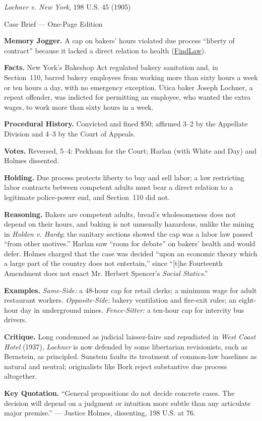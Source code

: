 \documentclass[12pt]{article}
\begin{document}
\begin{center}
{\Large \textit{Lochner v. New York}, 198 U.S. 45 (1905)\par}
\vspace{0.3em}
{\normalsize Case Brief --- One-Page Edition\par}
\end{center}

\textbf{Memory Jogger.} A cap on bakers' hours violated due process ``liberty of contract'' because it lacked a direct relation to health (\href{https://caselaw.findlaw.com/court/us-supreme-court/198/45.html}{FindLaw}).

\textbf{Facts.} New York's Bakeshop Act regulated bakery sanitation and, in Section~110, barred bakery employees from working more than sixty hours a week or ten hours a day, with no emergency exception. Utica baker Joseph Lochner, a repeat offender, was indicted for permitting an employee, who wanted the extra wages, to work more than sixty hours in a week.

\textbf{Procedural History.} Convicted and fined \$50; affirmed 3--2 by the Appellate Division and 4--3 by the Court of Appeals.

\textbf{Votes.} Reversed, 5--4: Peckham for the Court; Harlan (with White and Day) and Holmes dissented.

\textbf{Holding.} Due process protects liberty to buy and sell labor; a law restricting labor contracts between competent adults must bear a direct relation to a legitimate police-power end, and Section~110 did not.

\textbf{Reasoning.} Bakers are competent adults, bread's wholesomeness does not depend on their hours, and baking is not unusually hazardous, unlike the mining in \textit{Holden v. Hardy}; the sanitary sections showed the cap was a labor law passed ``from other motives.'' Harlan saw ``room for debate'' on bakers' health and would defer. Holmes charged that the case was decided ``upon an economic theory which a large part of the country does not entertain,'' since ``[t]he Fourteenth Amendment does not enact Mr. Herbert Spencer's \textit{Social Statics}.''

\textbf{Examples.} \emph{Same-Side:} a 48-hour cap for retail clerks; a minimum wage for adult restaurant workers. \emph{Opposite-Side:} bakery ventilation and fire-exit rules; an eight-hour day in underground mines. \emph{Fence-Sitter:} a ten-hour cap for intercity bus drivers.

\textbf{Critique.} Long condemned as judicial laissez-faire and repudiated in \textit{West Coast Hotel} (1937), \textit{Lochner} is now defended by some libertarian revisionists, such as Bernstein, as principled. Sunstein faults its treatment of common-law baselines as natural and neutral; originalists like Bork reject substantive due process altogether.

\textbf{Key Quotation.} ``General propositions do not decide concrete cases. The decision will depend on a judgment or intuition more subtle than any articulate major premise.'' --- Justice Holmes, dissenting, 198 U.S. at 76.
\end{document}
